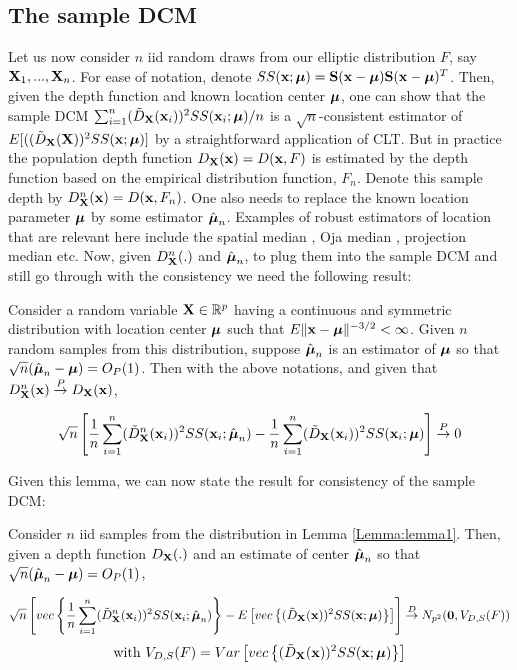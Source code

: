 \documentclass[fleqn,12pt]{article}
\begin{document}
\subsection{The sample DCM}
Let us now consider $n$ iid random draws from our elliptic distribution $F$, say ${\mathbf{X}}_1,...,{\mathbf{X}}_n$. For ease of notation, denote $SS({\bf{x}}; {\boldsymbol{\mu}}) = {\mathbf{S}}({\bf{x}} - {\boldsymbol{\mu}}) {\mathbf{S}}({\bf{x}} - {\boldsymbol{\mu}})^T$. Then, given the depth function and known location center ${\boldsymbol{\mu}}$, one can show that the sample DCM $\sum_{i=1}^n (\tilde D_{\mathbf{X}}({\bf{x}}_i))^2SS({\bf{x}}_i; {\boldsymbol{\mu}}) /n$ is a $\sqrt n$-consistent estimator of $E[( (\tilde D_{\mathbf{X}} ({\mathbf{X}}))^2 SS({\bf{x}}; {\boldsymbol{\mu}})]$ by a straightforward application of CLT. But in practice the population depth function $D_{\mathbf{X}}({\bf{x}}) = D({\bf{x}}, F)$ is estimated by the depth function based on the empirical distribution function, $F_n$. Denote this sample depth by $D^n_{\mathbf{X}} ({\bf{x}}) = D({\bf{x}}, F_n)$. One also needs to replace the known location parameter ${\boldsymbol{\mu}}$ by some estimator $\hat{{\boldsymbol{\mu}}}_n$. Examples of robust estimators of location that are relevant here include the spatial median \citep{haldane48,brown83}, Oja median \citep{oja83}, projection median \citep{zuo03} etc. Now, given $D^n_{\mathbf{X}}(.)$ and $\hat {{\boldsymbol{\mu}}}_n$, to plug them into the sample DCM and still go through with the consistency we need the following result:

\begin{Lemma} \label{Lemma:lemma1}
Consider a random variable ${\mathbf{X}} \in \mathbb{R}^p$ having a continuous and symmetric distribution with location center ${\boldsymbol{\mu}}$ such that $E\|{\bf{x}} - {\boldsymbol{\mu}} \|^{-3/2} < \infty$. Given $n$ random samples from this distribution, suppose $\hat{{\boldsymbol{\mu}}}_n$ is an estimator of ${\boldsymbol{\mu}}$ so that $\sqrt n (\hat{{\boldsymbol{\mu}}}_n - {\boldsymbol{\mu}}) = O_P(1) $. Then with the above notations, and given that $D^n_{\mathbf{X}} ({\bf{x}}) \stackrel{P}{\rightarrow} D_{\mathbf{X}} ({\bf{x}})$,

$$ \sqrt n \left[
\frac{1}{n} \sum_{i=1}^n (\tilde D^n_{\mathbf{X}} ({\bf{x}}_i))^2 SS({\bf{x}}_i; \hat{{\boldsymbol{\mu}}}_n) -
\frac{1}{n} \sum_{i=1}^n (\tilde D_{\mathbf{X}} ({\bf{x}}_i))^2 SS({\bf{x}}_i; {\boldsymbol{\mu}}) \right]
\stackrel{P}{\rightarrow} 0 $$
\end{Lemma}

Given this lemma, we can now state the result for consistency of the sample DCM:

\begin{Theorem} \label{Theorem:rootn}
Consider $n$ iid samples from the distribution in Lemma \ref{Lemma:lemma1}. Then, given a depth function $D_{\mathbf{X}}(.)$ and an estimate of center $\hat{{\boldsymbol{\mu}}}_n$ so that $\sqrt n(\hat {{\boldsymbol{\mu}}}_n - {\boldsymbol{\mu}}) = O_P(1)$,

$$ \sqrt n \left[ vec\left\{ \frac{1}{n} \sum_{i=1}^n (\tilde D^n_{\mathbf{X}} ({\bf{x}}_i))^2 SS({\bf{x}}_i; \hat{{\boldsymbol{\mu}}}_n) \right\} - E \left[ vec\left\{ (\tilde D_{\mathbf{X}} ({\bf{x}}))^2 SS({\bf{x}}; {\boldsymbol{\mu}}) \right\} \right] \right]
\stackrel{D}{\rightarrow}
N_{p^2} ({\bf 0}, V_{D,S}(F)) $$
$$ \text{with } V_{D,S}(F) = Var \left[vec \left\{ (\tilde D_{\mathbf{X}} ({\bf{x}}))^2 SS({\bf{x}}; {\boldsymbol{\mu}}) \right\} \right] $$
\end{Theorem}
\end{document}
